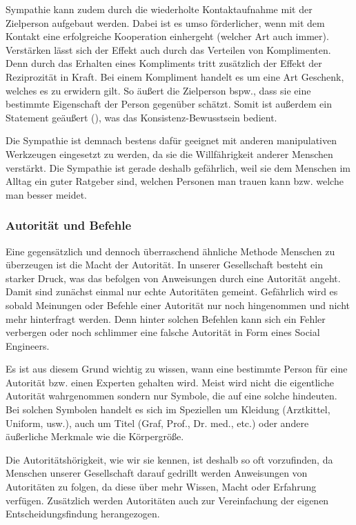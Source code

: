 Sympathie kann zudem durch die wiederholte Kontaktaufnahme mit der Zielperson aufgebaut werden. Dabei ist es umso förderlicher, wenn mit dem Kontakt eine erfolgreiche Kooperation einhergeht (welcher Art auch immer). Verstärken lässt sich der Effekt auch durch das Verteilen von Komplimenten. Denn durch das Erhalten eines Kompliments tritt zusätzlich der Effekt der Reziprozität in Kraft. Bei einem Kompliment handelt es um eine Art Geschenk, welches es zu erwidern gilt. So äußert die Zielperson bspw., dass sie eine bestimmte Eigenschaft der Person gegenüber schätzt. Somit ist außerdem ein Statement geäußert (), was das Konsistenz-Bewusstsein bedient.

Die Sympathie ist demnach bestens dafür geeignet mit anderen manipulativen Werkzeugen eingesetzt zu werden, da sie die Willfährigkeit anderer Menschen verstärkt. Die Sympathie ist gerade deshalb gefährlich, weil sie dem Menschen im Alltag ein guter Ratgeber sind, welchen Personen man trauen kann bzw. welche man besser meidet. \citep{cialdini}

\subsubsection{Autorität und Befehle}\label{sec:autorität-und-befehle}
Eine gegensätzlich und dennoch überraschend ähnliche Methode Menschen zu überzeugen ist die Macht der Autorität. In unserer Gesellschaft besteht ein starker Druck, was das befolgen von Anweisungen durch eine Autorität angeht. Damit sind zunächst einmal nur echte Autoritäten gemeint. Gefährlich wird es sobald Meinungen oder Befehle einer Autorität nur noch hingenommen und nicht mehr hinterfragt werden. Denn hinter solchen Befehlen kann sich ein Fehler verbergen oder noch schlimmer eine falsche Autorität in Form eines Social Engineers.

Es ist aus diesem Grund wichtig zu wissen, wann eine bestimmte Person für eine Autorität bzw. einen Experten gehalten wird. Meist wird nicht die eigentliche Autorität wahrgenommen sondern nur Symbole, die auf eine solche hindeuten. Bei solchen Symbolen handelt es sich im Speziellen um Kleidung (Arztkittel, Uniform, usw.), auch um Titel (Graf, Prof., Dr. med., etc.) oder andere äußerliche Merkmale wie die Körpergröße.

Die Autoritätshörigkeit, wie wir sie kennen, ist deshalb so oft vorzufinden, da Menschen unserer Gesellschaft darauf gedrillt werden Anweisungen von Autoritäten zu folgen, da diese über mehr Wissen, Macht oder Erfahrung verfügen. Zusätzlich werden Autoritäten auch zur Vereinfachung der eigenen Entscheidungsfindung herangezogen. \citep{cialdini}
